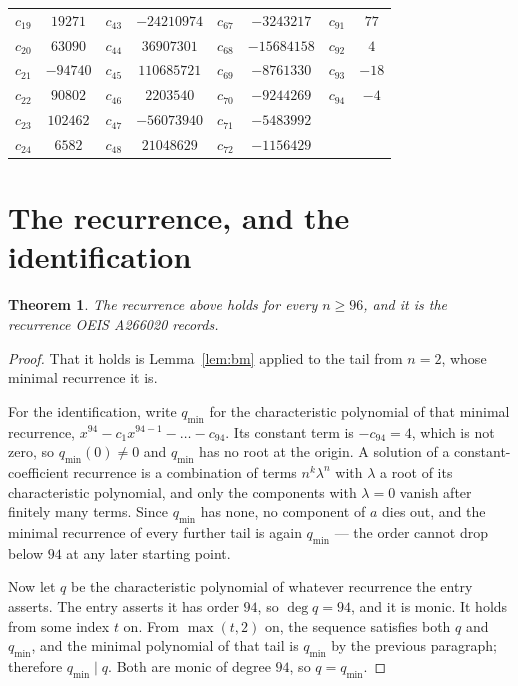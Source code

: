 \documentclass[11pt,a4paper]{article}
\theoremstyle{plain}
\newtheorem{theorem}{Theorem}
\theoremstyle{definition}
\begin{document}
\begin{center}
\begin{tabular}{cccccccc}
$c_{19}$ & $19271$ & $c_{43}$ & $-24210974$ & $c_{67}$ & $-3243217$ & $c_{91}$ & $77$ \\
$c_{20}$ & $63090$ & $c_{44}$ & $36907301$ & $c_{68}$ & $-15684158$ & $c_{92}$ & $4$ \\
$c_{21}$ & $-94740$ & $c_{45}$ & $110685721$ & $c_{69}$ & $-8761330$ & $c_{93}$ & $-18$ \\
$c_{22}$ & $90802$ & $c_{46}$ & $2203540$ & $c_{70}$ & $-9244269$ & $c_{94}$ & $-4$ \\
$c_{23}$ & $102462$ & $c_{47}$ & $-56073940$ & $c_{71}$ & $-5483992$ &  &  \\
$c_{24}$ & $6582$ & $c_{48}$ & $21048629$ & $c_{72}$ & $-1156429$ &  &  \\
\end{tabular}
\end{center}

\section{The recurrence, and the identification}

\begin{theorem}
The recurrence above holds for every $n\ge96$, and it is the recurrence OEIS A266020 records.
\end{theorem}

\begin{proof}
That it holds is Lemma~\ref{lem:bm} applied to the tail from $n=2$, whose minimal
recurrence it is.

For the identification, write $q_{\min}$ for the characteristic polynomial of that minimal
recurrence, $x^{94}-c_1x^{94-1}-\dots-c_{94}$. Its constant term is
$-c_{94}=4$, which is not zero, so $q_{\min}(0)\neq0$ and $q_{\min}$ has no
root at the origin. A solution of a constant-coefficient recurrence is a combination of terms
$n^{k}\lambda^{n}$ with $\lambda$ a root of its characteristic polynomial, and only the
components with $\lambda=0$ vanish after finitely many terms. Since $q_{\min}$ has none, no
component of $a$ dies out, and the minimal recurrence of every further tail is again
$q_{\min}$ --- the order cannot drop below $94$ at any later starting point.

Now let $q$ be the characteristic polynomial of whatever recurrence the entry asserts. The
entry asserts it has order $94$, so $\deg q=94$, and it is monic. It holds from some
index $t$ on. From $\max(t,2)$ on, the sequence satisfies both $q$ and $q_{\min}$, and
the minimal polynomial of that tail is $q_{\min}$ by the previous paragraph; therefore
$q_{\min}\mid q$. Both are monic of degree $94$, so $q=q_{\min}$.
\end{proof}
\end{document}
